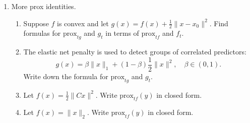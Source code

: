\documentclass[11pt]{amsart}
\newcommand{\prox}{\mathrm{prox}}
\begin{document}
\begin{enumerate}
\begin{enumerate}
\bigskip
\end{enumerate}

\vskip 32pt

\item More prox identities. 
\vskip 16pt
\begin{enumerate}

\item Suppose $f$ is convex and let $g(x) = f(x) + \frac{1}{2}\|x-x_0\|^2$. 
Find formulas for $\prox_{t g}$ and $g_t$ in terms of $\prox_{t f}$ and $f_t$.
\bigskip

\item The elastic net penalty is used to detect groups of correlated predictors:
\[
g(x) = \beta \|x\|_1 + (1-\beta) \frac{1}{2}\|x\|^2, \quad \beta \in (0,1).
\] 
Write down the formula for $\prox_{t g}$ and $g_t$.
\bigskip

\item Let $f(x) = \frac{1}{2}\|Cx\|^2$. Write $\prox_{t f}(y)$ in closed form.

\bigskip

\item Let $f(x) = \|x\|_2$. Write $\prox_{tf}(y)$ in closed form.

\end{enumerate}
\end{enumerate}

\vskip 32pt

\bigskip



\bigskip\bigskip
\end{document}
